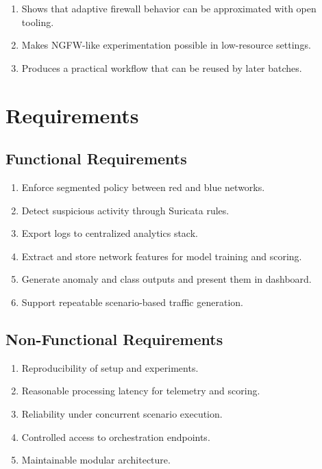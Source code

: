 \documentclass[12pt,a4paper]{article}
\begin{document}
\begin{enumerate}
    \item Shows that adaptive firewall behavior can be approximated with open tooling.
    \item Makes NGFW-like experimentation possible in low-resource settings.
    \item Produces a practical workflow that can be reused by later batches.
\end{enumerate}

\section{Requirements}

\subsection{Functional Requirements}

\begin{enumerate}
    \item Enforce segmented policy between red and blue networks.
    \item Detect suspicious activity through Suricata rules.
    \item Export logs to centralized analytics stack.
    \item Extract and store network features for model training and scoring.
    \item Generate anomaly and class outputs and present them in dashboard.
    \item Support repeatable scenario-based traffic generation.
\end{enumerate}

\subsection{Non-Functional Requirements}

\begin{enumerate}
    \item Reproducibility of setup and experiments.
    \item Reasonable processing latency for telemetry and scoring.
    \item Reliability under concurrent scenario execution.
    \item Controlled access to orchestration endpoints.
    \item Maintainable modular architecture.
\end{enumerate}
\end{document}
